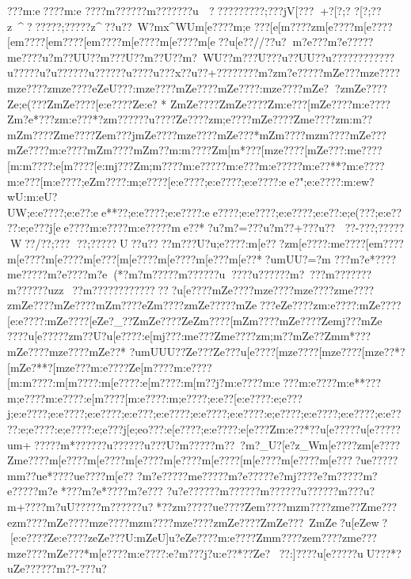 {{{{{{{{{{{{{{{{{{{{{{{{{{{???{m:e????m:e ????}{m??????m???????u

??????????;???jV[???+?[?;?  
?[?;??z~^??????;?????z^??u??~W?{mx^WU{m[e????{m;e
???[e[m????zm[e????{m[e????[e{m????[e{m????[e{m????{m[e????{m[e????{m[e  ??u[e??//??u?{m?e???{m?e?????m{e ????u?m??UU?}?m???U?}?m ??U?}?m?~WU??m???U???u??UU??u??????}?????}?u?????u?u??????u??????u???}?u???x??u??+???}????}?m\Xp?zm?e?????mZe???{mze????{mze????zmze????eZeU???:mze????{mZe????{mZe????:mze????{mZe??zmZe????Ze;e(???ZmZe????[e:e????Ze:e?
*
ZmZe????ZmZe????Zm:e???[mZe????{m:e????Zm?e*???zm:e???*?zm?????}?u????}Ze????zm;e????{mZe????Zm{e????zm:m??{mZm????Zm{e????Ze{m???j{mZe????{mze????{mZe???*{mZm????{mzm????{mZe??? {mZe????{m:e????{mZm????{mZm??{m:m????Zm[m*???[mze????[mZe???:m{e????[m:m????:e[m????[e:mj???Zm;m????{m:e?????m:e???m:e?????m:e??**?m:e????{m:e???[m:e????;eZm????:m;e????[e:e????;e:e????;e:e????:ee  ?";e:e????:m:ew?wU:m:eU?UW;e:e????;e:e??:ee**??;e:e????;e:e????:ee????;e:e????;e:e????;e:e??:e;e(???;e:e????:e;e???j[ee????{m:e????{m:e?????me??*?u?m?=???u?m??+???u??
??}-???;?????W?? /??;???
??;?????U??u ????{m???U?u;e????:m[e???zm[e????:m{e????[e{m????{m[e????{m[e????{m[e???[m[e????{m[e????{m[e???{m[e??*?u{mUU?=?}{m%
???m?e*????m{e?????m?e ????m?e(*?m?m????}?m?????}?u???}?u?????}?m?~??}?m???????m??????uzz~??m??????}??????}???u[e????{mZe????{mze????{mze????zm{e????zmZe????{mZe????{mZm????{eZm????zmZe?????mZe???{eZe????zm:e????:mZe????[e:e????:mZe????[eZe?_??ZmZe????ZeZm????[mZm????{mZe????Ze{mj???{mZe
????u[e?????}zm??}U?u[e????:e[mj???:m{e???Zm{e????zm;m??{mZe??Zm{m*???{mZe????{mze????{mZe??*
?u{mUUU??}Ze???}Ze???u[e????[mze????[mze????[mze??*?[mZe?**?[mze???{m:e????Ze[m????{m:e????[m:m????:m[m????:m[e????:e[m????:m[m??j?{m:e????{m:e???{m:e????{m:e**???m;e????{m:e????:e[m????[m:e????:m;e????;e:e??[e:e????:e;e???j;e:e????;e:e????;e:e????;e:e???;e:e????;e:e????;e:e????:e;e????;e:e????;e:e????;e:e????:e;e????:e;e????:e;e???j[e;eo???:e[e????;e:e????:e[e???Z{m:e??*??u[e?????u[e?????u{m+?????m*??????u ??????u???U?}{m  ?????m ??~?}{m ?_U?}[e?z_W{m[e????zm[e????Zm{e????{m[e????{m[e????{m[e????{m[e????{m[e????[m[e????{m[e????{m[e????u{e?????m{m? ?u{e*????u{e????{m[e ??
?m?e?????m{e?????m?e?????e?mj????e?m?????m?e?????m?e*???m?e*????m?e???
?u?e?????}?m?????}?m?????}?u?????}?m???u?m+????m?uU????}?m??????u?*??zm?????u{e????Ze{m????{mzm????zm{e??Zm{e???{ezm????{mZe????{mze????{mzm????{mze????zmZe????ZmZe???~ZmZe?u}[eZew?[e:e????Ze:e????zeZe???U:mZeU]u?{eZe????{m:e????Zm{m????ze{m????zm{e???{mze????{mZe???*{m[e????{m:e????:e?m???j?u:e??* ??Ze???:]??? ?u[e?????uU???*?uZe??????{m??-???u?
}}}}}}}}}}}}}}}}}}}}}}}}}}}}}}}}}}}}}}}}}}}}}}}}}}}}}}}}}}}}}}}}}}}}}}}}}}}}}}}}}}}}}}}}}}}}}}}}}}}}}}}}}}}}}}}}}
